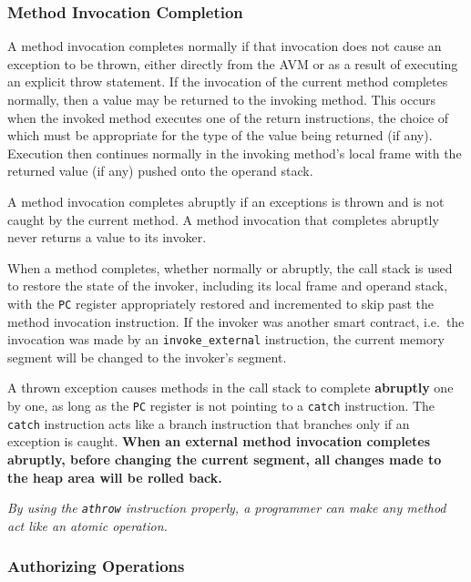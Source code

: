 \documentclass[11pt]{article}
\begin{document}
    \subsubsection{Method Invocation Completion}

    A method invocation completes normally if that invocation does not cause an exception to be thrown, either
    directly from the AVM or as a result of executing an explicit throw statement.
    If the invocation of the current method completes normally, then a value may be returned to the invoking method.
    This occurs when the invoked method executes one of the return instructions, the choice of which must be
    appropriate for the type of the value being returned (if any).
    Execution then continues normally in the invoking method's local frame with the returned value (if any)
    pushed onto the operand stack.

    A method invocation completes abruptly if an exceptions is thrown and is not caught by the current method.
    A method invocation that completes abruptly never returns a value to its invoker.

    When a method completes, whether normally or abruptly, the call stack is used to restore the state of the invoker,
    including its local frame and operand stack, with the \texttt{PC} register appropriately restored and incremented
    to skip past the method invocation instruction.
    If the invoker was another smart contract, i.e.\ the invocation was made by an \texttt{invoke\_external}
    instruction, the current memory segment will be changed to the invoker's segment.

    A thrown exception causes methods in the call stack to complete \textbf{abruptly} one by one, as long as the
    \texttt{PC} register is not pointing to a \texttt{catch} instruction.
    The \texttt{catch} instruction acts like a branch instruction that branches only if an exception is caught.
    \textbf{When an external method invocation completes abruptly, before changing the current segment, all changes
    made to the heap area will be rolled back.}

    \emph{By using the \texttt{athrow} instruction properly, a programmer can make any method act like an atomic
    operation.}

    \subsubsection{Authorizing Operations}
\end{document}
